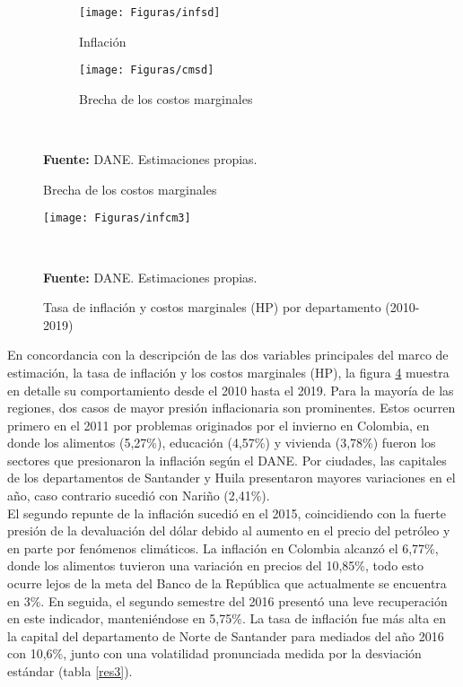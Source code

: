 \begin{figure}[H]
\caption{Dispersión de la inflación y la brecha de los costos marginales}
\begin{subfigure}{0.48\textwidth}
  \centering
	\texttt{[image: Figuras/infsd]} 
  \caption{Inflación}
  \label{dispfa}
\end{subfigure}
\begin{subfigure}{0.48\textwidth}
  \centering
	\texttt{[image: Figuras/cmsd]} 
  \caption{Brecha de los costos marginales}
  \label{}
\end{subfigure}
	\label{dispf}\\
  \raggedright  \scriptsize \textbf{Fuente:} DANE. Estimaciones propias.
\end{figure}	



\begin{figure}%
  	\centering 		
  	\caption{Tasa de inflación y costos marginales (HP) por departamento (2010-2019)}
	\texttt{[image: Figuras/infcm3]}
	\raggedright  \scriptsize %
		\label{icm23}\\
  \raggedright  \scriptsize \textbf{Fuente:} DANE. Estimaciones propias.
	\end{figure}

En concordancia con la descripción de las dos variables principales del marco de estimación, la tasa de inflación y los costos marginales (HP), la figura \ref{icm23} muestra en detalle su comportamiento desde el 2010 hasta el 2019. Para la mayoría de las regiones, dos casos de mayor presión inflacionaria son prominentes. Estos ocurren primero en el 2011 por problemas originados por el invierno en Colombia, en donde los  alimentos (5,27\%), educación (4,57\%)  y vivienda (3,78\%) fueron los sectores que presionaron la inflación según el DANE. Por ciudades, las capitales de los departamentos de Santander y Huila presentaron mayores variaciones en el año, caso contrario sucedió con Nariño (2,41\%).\\
 	
El segundo repunte de la inflación sucedió en el 2015, coincidiendo con la fuerte presión de la  devaluación del dólar  debido al aumento en el precio del petróleo y en parte por fenómenos climáticos. La inflación en Colombia alcanzó el 6,77\%,  donde  los alimentos tuvieron una variación en precios del 10,85\%, todo esto ocurre  lejos de la meta del Banco de la República que actualmente se encuentra en 3\%. En seguida, el segundo semestre del 2016 presentó una leve recuperación en este indicador, manteniéndose en 5,75\%. La tasa de inflación fue más alta en la capital del departamento de Norte de Santander para mediados del año 2016 con 10,6\%,  junto con una volatilidad pronunciada medida por la desviación estándar (tabla \ref{res3}).\\

